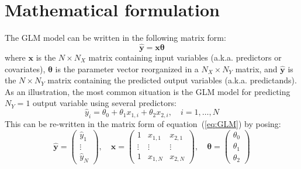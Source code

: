 \documentclass[a4paper]{article}
\begin{document}
\section{Mathematical formulation}
The GLM model can be written in the following matrix form:
%
\begin{equation}
\hat{\boldsymbol{y}}=\boldsymbol{x}\boldsymbol{\theta}
\label{eq:GLM}
\end{equation}
%
where $\boldsymbol{x}$ is the $N \times N_X$ matrix containing input variables (a.k.a. predictors or covariates), $\boldsymbol{\theta}$ is the parameter vector reorganized in a $N_X \times N_Y$ matrix, and $\hat{\boldsymbol{y}}$ is the $N \times N_Y$ matrix containing the predicted output variables (a.k.a. predictands).\\
As an illustration, the most common situation is the GLM model for predicting $N_Y=1$ output variable using several predictors: 
%
\begin{equation}
\hat{y}_i=\theta_0+\theta_1 x_{1,i}+\theta_2 x_{2,i}, \quad i=1, \dots ,N
\label{eq:example}
\end{equation}
%
This can be re-written in the matrix form of equation~(\ref{eq:GLM}) by posing:
%
\begin{equation}
\hat{\boldsymbol{y}}=
\begin{pmatrix}
   \hat{y}_1 \\ \vdots \\ \hat{y}_N 
\end{pmatrix}
,\quad
\boldsymbol{x}=
\begin{pmatrix}
  1 & x_{1,1} & x_{2,1} \\
  \vdots & \vdots & \vdots \\
  1 & x_{1,N} & x_{2,N}
\end{pmatrix}
,\quad
\boldsymbol{\theta}=
\begin{pmatrix}
  \theta_0 \\ \theta_1 \\ \theta_2 
\end{pmatrix}
\label{eq:example2}
\end{equation}
\end{document}
